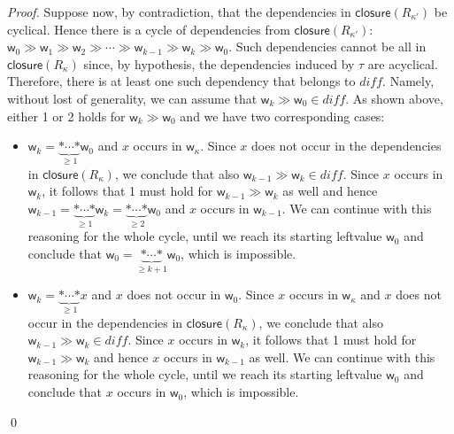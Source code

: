 \begin{proof}
  Suppose now, by contradiction, that the dependencies in
  $\mathsf{closure}(R_{\kappa'})$ be cyclical. Hence there is a cycle of dependencies
  from $\mathsf{closure}(R_{\kappa'})$: $\mathsf{w}_0\gg\mathsf{w}_1\gg\mathsf{w}_2\gg\cdots\gg
  \mathsf{w}_{k-1}\gg\mathsf{w}_k\gg\mathsf{w}_0$. Such dependencies
  cannot be all in $\mathsf{closure}(R_\kappa)$ since, by hypothesis, the dependencies
  induced by $\tau$ are acyclical. Therefore, there is at least one such dependency
  that belongs to $\mathit{diff}$. Namely, without lost of generality, we can assume that
  $\mathsf{w}_k\gg\mathsf{w}_0\in\mathit{diff}$. As shown above, either 1 or 2 holds for
  $\mathsf{w}_k\gg\mathsf{w}_0$ and we have two corresponding cases:
  \begin{itemize}
  \item $\mathsf{w}_k=\underbrace{\mathtt{*}\cdots\mathtt{*}}_{\ge 1}\mathsf{w}_0$
    and $x$ occurs in $\mathsf{w}_\kappa$. Since $x$ does not occur in the dependencies
    in $\mathsf{closure}(R_\kappa)$, we conclude that also
    $\mathsf{w}_{k-1}\gg\mathsf{w}_k\in\mathit{diff}$. Since $x$ occurs in $\mathsf{w}_k$,
    it follows that 1 must hold for $\mathsf{w}_{k-1}\gg\mathsf{w}_k$ as well and hence
    $\mathsf{w}_{k-1}=\underbrace{\mathtt{*}\cdots\mathtt{*}}_{\ge 1}\mathsf{w}_k=
    \underbrace{\mathtt{*}\cdots\mathtt{*}}_{\ge 2}\mathsf{w}_0$ and $x$
    occurs in $\mathsf{w}_{k-1}$. We can continue with this reasoning for the whole cycle, until
    we reach its starting leftvalue $\mathsf{w}_0$ and conclude that
    $\mathsf{w}_0=\underbrace{\mathtt{*}\cdots\mathtt{*}}_{\ge k+1}\mathsf{w}_0$, which is
    impossible.
  \item $\mathsf{w}_k=\underbrace{\mathtt{*}\cdots\mathtt{*}}_{\ge 1}x$ and $x$ does not occur in
    $\mathsf{w}_0$. Since $x$ occurs in $\mathsf{w}_\kappa$
    and $x$ does not occur in the dependencies
    in $\mathsf{closure}(R_\kappa)$, we conclude that also
    $\mathsf{w}_{k-1}\gg\mathsf{w}_k\in\mathit{diff}$.
    Since $x$ occurs in $\mathsf{w}_k$,
    it follows that 1 must hold for $\mathsf{w}_{k-1}\gg\mathsf{w}_k$ and hence
    $x$ occurs in $\mathsf{w}_{k-1}$ as well. We can continue with
    this reasoning for the whole cycle, until
    we reach its starting leftvalue $\mathsf{w}_0$ and conclude that $x$ occurs in $\mathsf{w}_0$,
    which is impossible.
  \end{itemize}
  \qed
\end{proof}
